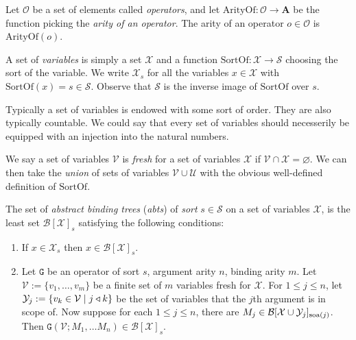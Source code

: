 \begin{defin}
    Let $\mathcal{O}$ be a set of elements called \emph{operators}, and let $\mathrm{ArityOf} : \mathcal{O} \to \mathbf{A}$ be the function picking the \emph{arity of an operator}. The arity of an operator $o\in \mathcal{O}$ is $\mathrm{ArityOf}(o)$.
\end{defin}

\begin{defin}\label{variables}
    A set of \emph{variables} is simply a set $\mathcal{X}$ and a function $\mathrm{SortOf} : \mathcal{X} \to \mathcal{S}$ choosing the sort of the variable. We write $\mathcal{X}_s$ for all the variables $x \in \mathcal{X}$ with $\mathrm{SortOf}(x) = s \in \mathcal{S}$. Observe that $\mathcal{S}$ is the inverse image of $\mathrm{SortOf}$ over $s$.
\end{defin}

\begin{remark}\label{var_order}
    Typically a set of variables is endowed with some sort of order. They are also typically countable. We could say that every set of variables should necesserily be equipped with an injection into the natural numbers.
\end{remark}

\begin{defin}
    We say a set of variables $\mathcal{V}$ is \emph{fresh} for a set of variables $\mathcal{X}$ if $\mathcal{V} \cap \mathcal{X} = \varnothing$. We can then take the \emph{union} of sets of variables $\mathcal{V} \cup \mathcal{U}$ with the obvious well-defined definition of $\mathrm{SortOf}$.
\end{defin}

\begin{defin}
    The set of \emph{abstract binding trees} (\emph{abts}) of \emph{sort} $s\in \mathcal{S}$ on a set of variables $\mathcal{X}$, is the least set $\mathcal{B}[\mathcal{X}]_s$ satisfying the following conditions:
    \begin{enumerate}
        \item If $x \in \mathcal{X}_s$ then $x \in \mathcal{B}[\mathcal{X}]_s$.
        \item Let $\mathtt{G}$ be an operator of sort $s$, argument arity $n$, binding arity $m$. Let $\mathcal{V} := \{v_1, \dots , v_m \}$ be a finite set of $m$ variables fresh for $\mathcal{X}$. For $1 \le j \le n$, let $\mathcal{Y}_j := \{ v_k \in \mathcal{V} \mid j \triangleleft k\}$ be the set of variables that the $j$th argument is in scope of. Now suppose for each $1 \le j \le n$, there are $M_j \in \mathcal{B}[\mathcal{X} \cup \mathcal{Y}_j]_{\text{soa}(j)}$. Then $\mathtt{G}(\mathcal{V}; M_1, \dots M_n) \in \mathcal{B}[\mathcal{X}]_s$.
    \end{enumerate}
\end{defin}

